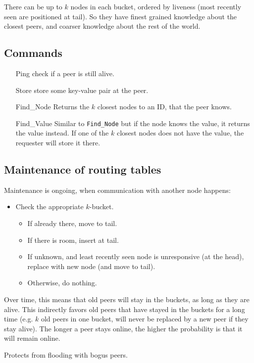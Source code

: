 	There can be up to $k$ nodes in each bucket, ordered by liveness (most recently seen are positioned at tail). So they have finest grained knowledge about the closest peers, and coarser knowledge about the rest of the world.
	
	\subsection{Commands}
	\begin{itemize}
		\item[Ping] check if a peer is still alive.
		\item[Store] store some key-value pair at the peer.
		\item[Find\_Node] Returns the $k$ closest nodes to an ID, that the peer knows.
		\item[Find\_Value] Similar to \texttt{Find\_Node} but if the node knows the value, it returns the value instead. If one of the $k$ closest nodes does not have the value, the requester will store it there.
	\end{itemize}
	
	\subsection{Maintenance of routing tables}
	Maintenance is ongoing, when communication with another node happens:
	\begin{itemize}
		\item Check the appropriate $k$-bucket.
		\begin{itemize}
			\item If already there, move to tail.
			\item If there is room, insert at tail.
			\item If unknown, and least recently seen node is unresponsive (at the head), replace with new node (and move to tail).
			\item Otherwise, do nothing.
		\end{itemize}
	\end{itemize}
	Over time, this means that old peers will stay in the buckets, as long as they are alive. This indirectly favors old peers that have stayed in the buckets for a long time (e.g. $k$ old peers in one bucket, will never be replaced by a new peer if they stay alive). The longer a peer stays online, the higher the probability is that it will remain online.
	
	Protects from flooding with bogus peers.
	
